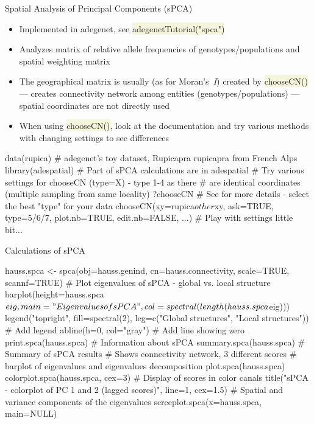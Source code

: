 \documentclass[compress, xelatex, 11pt, xcolor=svgnames, aspectratio=169,
	hyperref={
		bookmarks=true,
		unicode=true,
		colorlinks=true,
		pdftitle={Molecular data in R},
		plainpages=false,
		pdfauthor={Vojtech Zeisek},
		pdfsubject={Course about phylogeny and evolution in R},
		pdfcreator={XeLaTeX},
		pdfkeywords={R, evolution, phylogeny, molecular data},
		linkcolor=Crimson, %
		anchorcolor=Magenta, %
		citecolor=Magenta, %
		filecolor=Magenta, %
		menucolor=Magenta, %
		urlcolor=DodgerBlue, %
		},
	url={hyphens, lowtilde} %
	]{beamer}
\renewcommand{\texttt}[1]{\colorbox{Beige}{{\ttfamily #1}}}
\begin{document}
\begin{frame}[fragile]{Spatial Analysis of Principal Components (sPCA)}
	\begin{itemize}
		\item Implemented in adegenet, see \texttt{adegenetTutorial("spca")}
		\item Analyzes matrix of relative allele frequencies of genotypes/populations and spatial weighting matrix
		\item The geographical matrix is usually (as for Moran's~\textit{I}) created by \texttt{chooseCN()} --- creates connectivity network among entities (genotypes/populations) --- spatial coordinates are not directly used
		\item When using \texttt{chooseCN()}, look at the documentation and try various methods with changing settings to see differences
	\end{itemize}
	\begin{spluscode}
    data(rupica) # adegenet's toy dataset, Rupicapra rupicapra from French Alps
    library(adespatial) # Part of sPCA calculations are in adespatial
    # Try various settings for chooseCN (type=X) - type 1-4 as there
    # are identical coordinates (multiple sampling from same locality)
    ?chooseCN # See for more details - select the best "type" for your data
    chooseCN(xy=rupica$other$xy, ask=TRUE, type=5/6/7, plot.nb=TRUE,
      edit.nb=FALSE, ...) # Play with settings little bit...
	\end{spluscode}
\end{frame}

\begin{frame}[fragile]{Calculations of sPCA}
	\begin{spluscode}
    hauss.spca <- spca(obj=hauss.genind, cn=hauss.connectivity,
      scale=TRUE, scannf=TRUE)
    # Plot eigenvalues of sPCA - global vs. local structure
    barplot(height=hauss.spca$eig, main="Eigenvalues of sPCA",
      col=spectral(length(hauss.spca$eig)))
    legend("topright", fill=spectral(2), leg=c("Global structures",
      "Local structures")) # Add legend
    abline(h=0, col="gray") # Add line showing zero
    print.spca(hauss.spca) # Information about sPCA
    summary.spca(hauss.spca) # Summary of sPCA results
    # Shows connectivity network, 3 different scores
    # barplot of eigenvalues and eigenvalues decomposition
    plot.spca(hauss.spca)
    colorplot.spca(hauss.spca, cex=3) # Display of scores in color canals
    title("sPCA - colorplot of PC 1 and 2 (lagged scores)", line=1, cex=1.5)
    # Spatial and variance components of the eigenvalues
    screeplot.spca(x=hauss.spca, main=NULL)
	\end{spluscode}
\end{frame}
\end{document}

